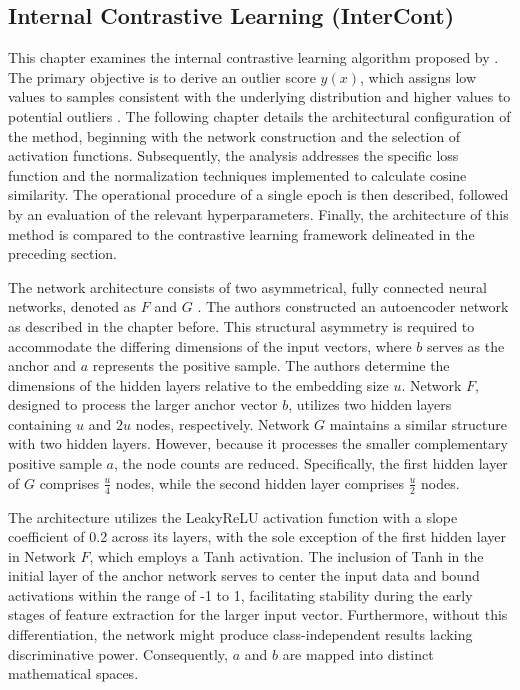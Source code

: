 \subsection{Internal Contrastive Learning (InterCont)}\label{sec:intercont}
This chapter examines the internal contrastive learning algorithm proposed by \citet{shenkar2022anomaly}. 
The primary objective is to derive an outlier score $y(x)$, which assigns low values to samples consistent with the underlying distribution and higher values to potential outliers \citep[p. 1]{shenkar2022anomaly}. 
The following chapter details the architectural configuration of the method, beginning with the network construction and the selection of activation functions. 
Subsequently, the analysis addresses the specific loss function and the normalization techniques implemented to calculate cosine similarity. 
The operational procedure of a single epoch is then described, followed by an evaluation of the relevant hyperparameters. 
Finally, the architecture of this method is compared to the contrastive learning framework delineated in the preceding section.


The network architecture consists of two asymmetrical, fully connected neural networks, denoted as $F$ and $G$ \citep[p. 5]{shenkar2022anomaly}.
The authors constructed an autoencoder network as described in the chapter before. 
This structural asymmetry is required to accommodate the differing dimensions of the input vectors, where $b$ serves as the anchor and $a$ represents the positive sample. 
The authors determine the dimensions of the hidden layers relative to the embedding size $u$. 
Network $F$, designed to process the larger anchor vector $b$, utilizes two hidden layers containing $u$ and $2u$ nodes, respectively. 
Network $G$ maintains a similar structure with two hidden layers.
However, because it processes the smaller complementary positive sample $a$, the node counts are reduced. 
Specifically, the first hidden layer of $G$ comprises $\frac{u}{4}$ nodes, while the second hidden layer comprises $\frac{u}{2}$ nodes. 



The architecture utilizes the LeakyReLU activation function with a slope coefficient of 0.2 across its layers, with the sole exception of the first hidden layer in Network $F$, which employs a Tanh activation. 
The inclusion of Tanh in the initial layer of the anchor network serves to center the input data and bound activations within the range of -1 to 1, facilitating stability during the early stages of feature extraction for the larger input vector. 
Furthermore, without this differentiation, the network might produce class-independent results lacking discriminative power. 
Consequently, $a$ and $b$ are mapped into distinct mathematical spaces.


